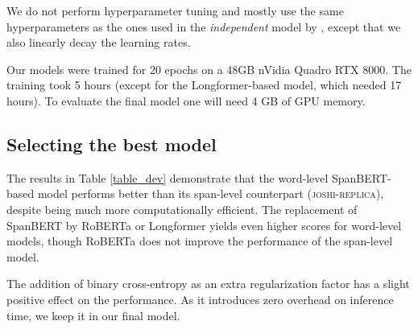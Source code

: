 \documentclass[11pt]{article}
\begin{document}
We do not perform hyperparameter tuning and mostly use the same hyperparameters as the ones used in the \emph{independent} model by \citet{joshi-etal-2020-spanbert}, except that we also linearly decay the learning rates.

Our models were trained for 20 epochs on a 48GB nVidia Quadro RTX 8000. The training took 5 hours (except for the Longformer-based model, which needed 17 hours). To evaluate the final model one will need 4 GB of GPU memory.

\subsection{Selecting the best model} The results in Table \ref{table_dev} demonstrate that the word-level SpanBERT-based model performs better than its span-level counterpart (\textsc{joshi-replica}), despite being much more computationally efficient.
The replacement of SpanBERT by RoBERTa or Longformer yields even higher scores for word-level models, though RoBERTa does not improve the performance of the span-level model.

The addition of binary cross-entropy as an extra regularization factor has a slight positive effect on the performance. As it introduces zero overhead on inference time, we keep it in our final model.
\end{document}
